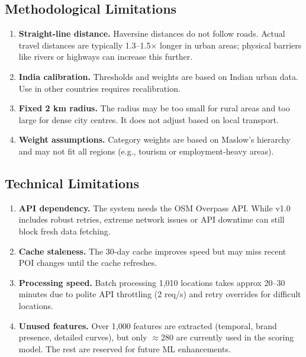 \documentclass[11pt,a4paper]{article}
\begin{document}
\subsection{Methodological Limitations}

\begin{enumerate}
  \item \textbf{Straight-line distance.} Haversine distances do not follow roads. Actual travel distances are typically 1.3--1.5$\times$ longer in urban areas; physical barriers like rivers or highways can increase this further.

  \item \textbf{India calibration.} Thresholds and weights are based on Indian urban data. Use in other countries requires recalibration.

  \item \textbf{Fixed 2 km radius.} The radius may be too small for rural areas and too large for dense city centres. It does not adjust based on local transport.

  \item \textbf{Weight assumptions.} Category weights are based on Maslow's hierarchy and may not fit all regions (e.g., tourism or employment-heavy areas).
\end{enumerate}

\subsection{Technical Limitations}

\begin{enumerate}
  \item \textbf{API dependency.} The system needs the OSM Overpass API. While v1.0 includes robust retries, extreme network issues or API downtime can still block fresh data fetching.

  \item \textbf{Cache staleness.} The 30-day cache improves speed but may miss recent POI changes until the cache refreshes.

  \item \textbf{Processing speed.} Batch processing 1,010 locations takes approx 20--30 minutes due to polite API throttling (2 req/s) and retry overrides for difficult locations.

  \item \textbf{Unused features.} Over 1,000 features are extracted (temporal, brand presence, detailed curves), but only $\approx$280 are currently used in the scoring model. The rest are reserved for future ML enhancements.
\end{enumerate}
\end{document}
